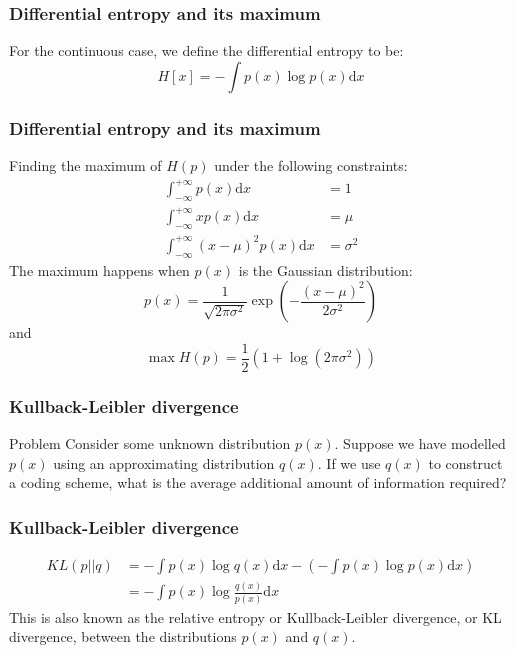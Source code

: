 \documentclass{beamer}
\begin{document}
\begin{frame}
    \frametitle{Differential entropy and its maximum}
    For the continuous case, we define the differential entropy to be:
    \begin{equation*}
        H[x]=-\int{}p(x)\log{}p(x)\mathrm{d}x
    \end{equation*}
\end{frame}

\begin{frame}
    \frametitle{Differential entropy and its maximum}
    Finding the maximum of $H(p)$ under the following constraints:
    \begin{align*}
        \int_{-\infty}^{+\infty}p(x)\mathrm{d}x&=1 \\
        \int_{-\infty}^{+\infty}xp(x)\mathrm{d}x&=\mu \\
        \int_{-\infty}^{+\infty}(x-\mu)^{2}p(x)\mathrm{d}x&=\sigma^{2}
    \end{align*}
    The maximum happens when $p(x)$ is the Gaussian distribution:
    \begin{equation*}
        p(x)=\frac{1}{\sqrt{2\pi\sigma^{2}}}\exp(-\frac{(x-\mu)^{2}}{2\sigma^{2}})
    \end{equation*}
    and
    \begin{equation*}
        \max{}H(p)=\frac{1}{2}(1+\log(2\pi\sigma^{2}))
    \end{equation*}
\end{frame}

\begin{frame}
    \frametitle{Kullback-Leibler divergence}
    \begin{block}{Problem}
        Consider some unknown distribution $p(x)$. Suppose we have modelled $p(x)$ using an approximating distribution $q(x)$. If we use $q(x)$ to construct a coding scheme, what is the average additional amount of information required?
    \end{block}
\end{frame}

\begin{frame}
    \frametitle{Kullback-Leibler divergence}
    \begin{align*}
        KL(p||q)&=-\int{}p(x)\log{}q(x)\mathrm{d}x-(-\int{}p(x)\log{}p(x)\mathrm{d}x) \\
        &=-\int{}p(x)\log\frac{q(x)}{p(x)}\mathrm{d}x
    \end{align*}
    This is also known as the relative entropy or Kullback-Leibler divergence, or KL divergence, between the distributions $p(x)$ and $q(x)$.
\end{frame}
\end{document}
